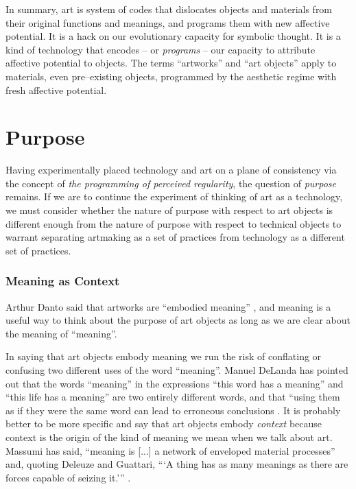 \documentclass[letterpaper]{article}
\begin{document}
    In summary, art is system of codes that dislocates objects and materials from their original functions and meanings, and programs them with new affective potential. It is a hack on our evolutionary capacity for symbolic thought. It is a kind of technology that encodes – or \emph{programs} – our capacity to attribute affective potential to objects. The terms “artworks” and “art objects” apply to materials, even pre–existing objects, programmed by the aesthetic regime with fresh affective potential.
    
\section{Purpose}

    Having experimentally placed technology and art on a plane of consistency via the concept of \emph{the programming of perceived regularity}, the question of \emph{purpose} remains. If we are to continue the experiment of thinking of art as a technology, we must consider whether the nature of purpose with respect to art objects is different enough from the nature of purpose with respect to technical objects to warrant separating artmaking as a set of practices from technology as a different set of practices.
    
    \subsubsection{Meaning as Context}

    Arthur Danto said that artworks are “embodied meaning” \citep[p.125]{DantoEmbdMnngs2007}, and meaning is a useful way to think about the purpose of art objects as long as we are clear about the meaning of “meaning”.
    
    In saying that art objects embody meaning we run the risk of conflating or confusing two different uses of the word “meaning”. Manuel DeLanda has pointed out that the words “meaning” in the expressions “this word has a meaning” and “this life has a meaning” are two entirely different words, and that “using them as if they were the same word can lead to erroneous conclusions \citep[pp.40–41]{DeLandaCsltyAndMnng2018}. It is probably better to be more specific and say that art objects embody \emph{context} because context is the origin of the kind of meaning we mean when we talk about art. Massumi has said, “meaning is [...] a network of enveloped material processes” and, quoting Deleuze and Guattari, “‘A thing has as many meanings as there are forces capable of seizing it.’” \citep[p.10]{MassumiAUsrsGdTCptlsmAndSchzphrn1992}.
\end{document}
